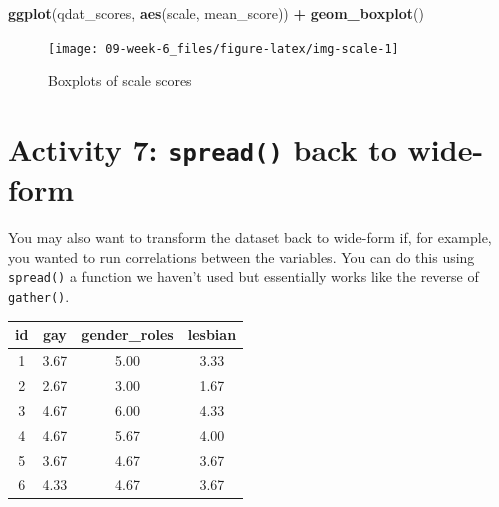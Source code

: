 \documentclass[]{book}
\newenvironment{Shaded}{\begin{snugshade}}{\end{snugshade}}
\newcommand{\CommentTok}[1]{\textcolor[rgb]{0.56,0.35,0.01}{\textit{#1}}}
\newcommand{\DataTypeTok}[1]{\textcolor[rgb]{0.13,0.29,0.53}{#1}}
\newcommand{\KeywordTok}[1]{\textcolor[rgb]{0.13,0.29,0.53}{\textbf{#1}}}
\newcommand{\NormalTok}[1]{#1}
\newcommand{\OperatorTok}[1]{\textcolor[rgb]{0.81,0.36,0.00}{\textbf{#1}}}
\newcommand{\StringTok}[1]{\textcolor[rgb]{0.31,0.60,0.02}{#1}}
\begin{document}
\begin{Shaded}
\begin{Highlighting}[]
\KeywordTok{ggplot}\NormalTok{(qdat_scores, }\KeywordTok{aes}\NormalTok{(scale, mean_score)) }\OperatorTok{+}
\StringTok{  }\KeywordTok{geom_boxplot}\NormalTok{()}
\end{Highlighting}
\end{Shaded}

\begin{figure}

{\centering \texttt{[image: 09-week-6\_files/figure-latex/img-scale-1]} 

}

\caption{Boxplots of scale scores}\label{fig:img-scale}
\end{figure}

\hypertarget{activity-7-spread-back-to-wide-form}{%
\section{\texorpdfstring{Activity 7: \texttt{spread()} back to wide-form}{Activity 7: spread() back to wide-form}}\label{activity-7-spread-back-to-wide-form}}

You may also want to transform the dataset back to wide-form if, for example, you wanted to run correlations between the variables. You can do this using \texttt{spread()} a function we haven't used but essentially works like the reverse of \texttt{gather()}.

\begin{Shaded}
\end{Shaded}

\begin{tabular}{c|c|c|c}
\hline
id & gay & gender\_roles & lesbian\\
\hline
1 & 3.67 & 5.00 & 3.33\\
\hline
2 & 2.67 & 3.00 & 1.67\\
\hline
3 & 4.67 & 6.00 & 4.33\\
\hline
4 & 4.67 & 5.67 & 4.00\\
\hline
5 & 3.67 & 4.67 & 3.67\\
\hline
6 & 4.33 & 4.67 & 3.67\\
\hline
\end{tabular}
\end{document}
